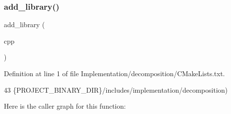 \subsubsection{\texorpdfstring{add\+\_\+library()}{add\_library()}}
{\footnotesize\ttfamily add\+\_\+library (\begin{DoxyParamCaption}\item[{D\+E\+C\+O\+M\+P\+O\+S\+I\+T\+I\+O\+N\+\_\+\+I\+M\+PL O\+B\+J\+E\+CT surface\+Obj\+Cerator.\+cpp surfaces\+Merger.\+cpp point\+On\+Surface.\+cpp triangle\+Collision.\+cpp edge\+On\+Surface.\+cpp face\+Collision.\+cpp edgescombiner.\+cpp commonedgefinder.\+cpp Assist\+Surface\+Generator.\+cpp splitsurfaces\+\_\+impl.\+cpp splitsolid\+\_\+impl.\+cpp preprocessor.\+cpp torus\+Convertor.\+cpp decompose\+Solid\+\_\+impl.\+cpp decomposition\+\_\+impl.\+cpp Solid\+Rebuilder.\+cpp Solid\+Splitter.\+cpp Solid\+Repairer.}]{cpp }\end{DoxyParamCaption})}



Definition at line 1 of file Implementation/decomposition/\+C\+Make\+Lists.\+txt.


\begin{DoxyCode}
43                \{PROJECT\_BINARY\_DIR\}/includes/implementation/decomposition)
\end{DoxyCode}
Here is the caller graph for this function\+:
